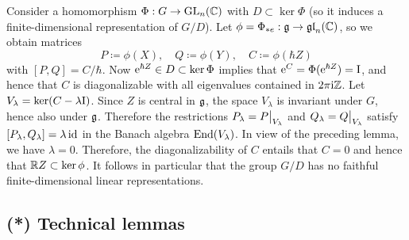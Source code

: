 \begin{example}
    Consider a homomorphism $\Phi:G\to\operatorname{GL}_n(\mathbb{C})$ with $D\subset \ker\Phi$ (so it induces a finite-dimensional representation of $G\slash D$). Let $\phi=\Phi_{\ast e}:\mathfrak{g}\to \mathfrak{gl}_n(\mathbb{C})$, so we obtain matrices
    \[P\coloneqq \phi(X), \quad Q\coloneqq \phi(Y),\quad C\coloneqq \phi(\hbar Z)\]
    with $[P,Q]=C/\hbar$. Now $\mathrm{e}^{\hbar Z}\in D\subset\ker\Phi$ implies that $\mathrm{e}^{C}=\Phi(\mathrm{e}^{\hbar Z})=\mathrm{I}$, and hence that $C$ is diagonalizable with all eigenvalues contained in $2\pi\mathrm{i}\mathbb{Z}$. Let $V_\lambda=\ker (C-\lambda \mathrm{I})$. Since $Z$ is central in $\mathfrak{g}$, the space $V_\lambda$ is invariant under $G$, hence also under $\mathfrak{g}$. Therefore the restrictions $P_\lambda=\restr{P}{V_\lambda}$ and $Q_\lambda=\restr{Q}{V_\lambda}$ satisfy $[P_\lambda,Q_\lambda]=\lambda \operatorname{id}$ in the Banach algebra $\operatorname{End}(V_\lambda)$. In view of the preceding lemma, we have $\lambda=0$. Therefore, the diagonalizability of $C$ entails that $C=0$ and hence that $\mathbb{R} Z\subset \ker\phi$. It follows in particular that the group $G\slash D$ has no faithful finite-dimensional linear representations.
\end{example}









\subsection{(*) Technical lemmas}


